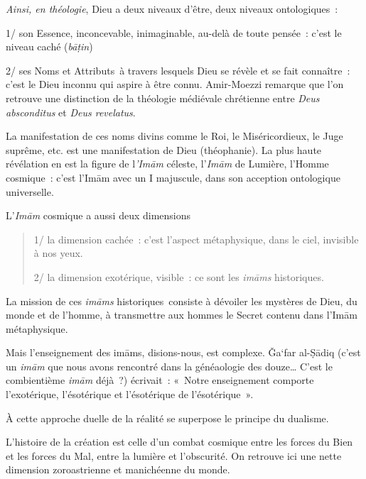 \emph{Ainsi, en théologie}, Dieu a deux niveaux d'être, deux niveaux
ontologiques~:

1/ son Essence, inconcevable, inimaginable, au-delà de toute pensée~:
c'est le niveau caché (\emph{bāṭin})

2/ ses Noms et Attributs~à travers lesquels Dieu se révèle et se fait
connaître~: c'est le Dieu inconnu qui aspire à être connu. Amir-Moezzi
remarque que l'on retrouve une distinction de la théologie médiévale
chrétienne entre \emph{Deus absconditus} et \emph{Deus revelatus}.

La manifestation de ces noms divins comme le Roi, le Miséricordieux, le
Juge suprême, etc. est une manifestation de Dieu (théophanie). La plus
haute révélation en est la figure de l\emph{'Imām} céleste,
l'\emph{Imām} de Lumière, l'Homme cosmique~: c'est l'Imām avec un I
majuscule, dans son acception ontologique universelle.

L'\emph{Imām} cosmique a aussi deux dimensions

\begin{quote}
1/ la dimension cachée~: c'est l'aspect métaphysique, dans le ciel,
invisible à nos yeux.

2/ la dimension exotérique, visible~: ce sont les \emph{imāms}
historiques.
\end{quote}

La mission de ces \emph{imāms} historiques~consiste à dévoiler les
mystères de Dieu, du monde et de l'homme, à transmettre aux hommes le
Secret contenu dans l'Imām métaphysique.

Mais l'enseignement des imāms, disions-nous, est complexe. Ǧa`far
al-Ṣādiq (c'est un \emph{imām} que nous avons rencontré dans la
généaologie des douze\ldots{} C'est le combientième \emph{imām} déjà~?)
écrivait~: «~Notre enseignement comporte l'exotérique, l'ésotérique et
l'ésotérique de l'ésotérique~».

À cette approche duelle de la réalité se superpose le principe du
dualisme.

L'histoire de la création est celle d'un combat cosmique entre les
forces du Bien et les forces du Mal, entre la lumière et l'obscurité. On
retrouve ici une nette dimension zoroastrienne et manichéenne du monde.

